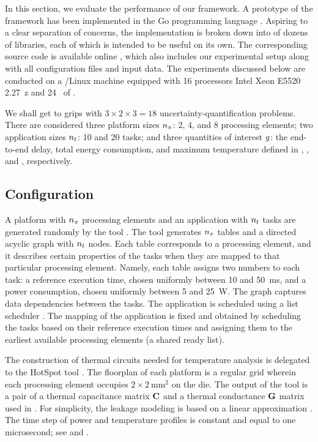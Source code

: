 In this section, we evaluate the performance of our framework. A prototype of
the framework has been implemented in the Go programming language \cite{go}.
Aspiring to a clear separation of concerns, the implementation is broken down
into of dozens of libraries, each of which is intended to be useful on its own.
The corresponding source code is available online \cite{sources}, which also
includes our experimental setup along with all configuration files and input
data. The experiments discussed below are conducted on a /Linux machine
equipped with 16 processors Intel Xeon E5520 2.27~z and 24~ of
.

We shall get to grips with $3 \times 2 \times 3 = 18$ uncertainty-quantification
problems. There are considered three platform sizes ${n_\pi}$: 2, 4, and 8
processing elements; two application sizes ${n_t}$: 10 and 20 tasks; and three
quantities of interest $g$: the end-to-end delay, total energy consumption, and
maximum temperature defined in , , and
, respectively.

\subsection{Configuration}

A platform with ${n_\pi}$ processing elements and an application with ${n_t}$ tasks
are generated randomly by the  tool \cite{dick1998}. The tool generates
${n_\pi}$ tables and a directed acyclic graph with ${n_t}$ nodes. Each table
corresponds to a processing element, and it describes certain properties of the
tasks when they are mapped to that particular processing element. Namely, each
table assigns two numbers to each task: a reference execution time, chosen
uniformly between 10 and 50~ms, and a power consumption, chosen uniformly
between 5 and 25~W. The graph captures data dependencies between the tasks. The
application is scheduled using a list scheduler \cite{adam1974}. The mapping of
the application is fixed and obtained by scheduling the tasks based on their
reference execution times and assigning them to the earliest available
processing elements (a shared ready list).

The construction of thermal  circuits needed for temperature analysis is
delegated to the HotSpot tool \cite{skadron2004}. The floorplan of each platform
is a regular grid wherein each processing element occupies $2 \times
2~\text{mm}^2$ on the die. The output of the tool is a pair of a thermal
capacitance matrix $\mathbf{C}$ and a thermal conductance $\mathbf{G}$ matrix used in
. For simplicity, the leakage modeling is based on a linear
approximation \cite{ukhov2012, liu2007}. The time step of power and temperature
profiles is constant and equal to one microsecond; see  and
.

